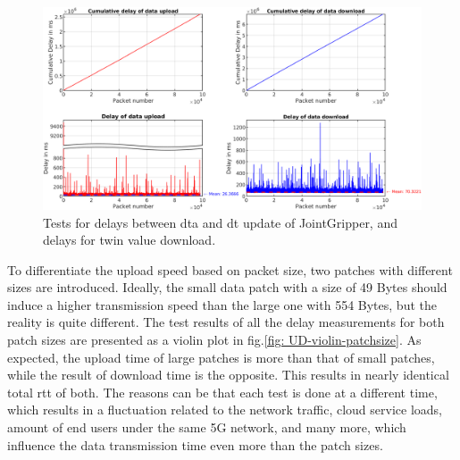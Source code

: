 \begin{figure}[htb]
    \centering
    \includegraphics[width=\textwidth]{figures/tests/DT/Delay_UploadDownload_JointGripper.png}
    \caption{Tests for delays between \gls{dta} and \gls{dt} update of JointGripper, 
    and delays for twin value download. \label{fig: UD-sep-JointGripper}}
\end{figure}


To differentiate the upload speed based on packet size, two patches with 
different sizes are introduced. Ideally, the small data patch with a size of 
49 Bytes should induce a higher transmission speed than the large one with 554 Bytes, 
but the reality is quite different. The test results of all the 
delay measurements for both patch sizes are presented as a violin plot in 
fig.\ref{fig: UD-violin-patchsize}. As expected, the upload time of large 
patches is more than that of small patches, while the result of download time is 
the opposite. This results in nearly identical total \gls{rtt} of both. 
The reasons can be that each test is done at a different time, which results in a 
fluctuation related to the network traffic, cloud service loads, amount of end users 
under the same 5G network, and many more, which influence the data transmission time 
even more than the patch sizes.

